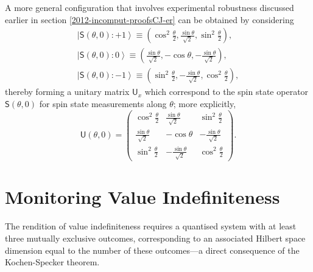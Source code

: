 \documentclass[%
 preprint,
 showpacs,
 showkeys,
 amsmath,
 amssymb,
 aps,
 pra,
 ]{revtex4-1}
\theoremstyle{definition}
\newcommand{\ket}[1]{\left| #1 \right>}
\begin{document}
{\color{blue}
A more general configuration that involves experimental robustness discussed earlier in section \ref{2012-incomput-proofsCJ-er}
can be obtained by considering
\begin{equation}
\begin{array}{l}
 \ket{\textsf{S}(\theta ,0) : +1} \equiv     \left( \cos ^2 \frac{\theta }{2} , \frac{\sin   \theta   }{\sqrt{2}} ,\sin^2 \frac{\theta }{2} \right),\\
 \ket{\textsf{S}(\theta ,0) : 0}  \equiv     \left( \frac{\sin  \theta}{\sqrt{2}} ,-   \cos  \theta    ,-\frac{\sin  \theta }{\sqrt{2}} \right),\\
 \ket{\textsf{S}(\theta ,0) : -1} \equiv       \left( \sin ^2 \frac{\theta }{2} ,-\frac{\sin   \theta    }{\sqrt{2}} ,\cos^2 \frac{\theta }{2} \right),
\end{array}
\end{equation}
thereby forming a unitary matrix $\textsf{U}_x $
which correspond to the spin state operator $\textsf{S}(\theta ,0)$ for spin state measurements along $\theta$;
more explicitly,
\begin{equation}
\textsf{U}(\theta ,0)
=
\left(
\begin{array}{cccc}
\cos ^2 \frac{\theta }{2} &\frac{\sin   \theta   }{\sqrt{2}} &\sin^2 \frac{\theta }{2} \\
\frac{ \sin  \theta}{\sqrt{2}}  &-   \cos  \theta    &-\frac{\sin  \theta  }{\sqrt{2}}  \\
 \sin ^2 \frac{\theta }{2} &-\frac{\sin   \theta   }{\sqrt{2}}  &\cos^2 \frac{\theta }{2}
\end{array}
\right).
\end{equation}

}
\fi
\section{Monitoring Value Indefiniteness}

The rendition of value indefiniteness requires a quantised system with at least three mutually exclusive outcomes,
corresponding to an associated Hilbert space dimension equal to the number of these outcomes---a direct consequence of the Kochen-Specker theorem.
\end{document}

